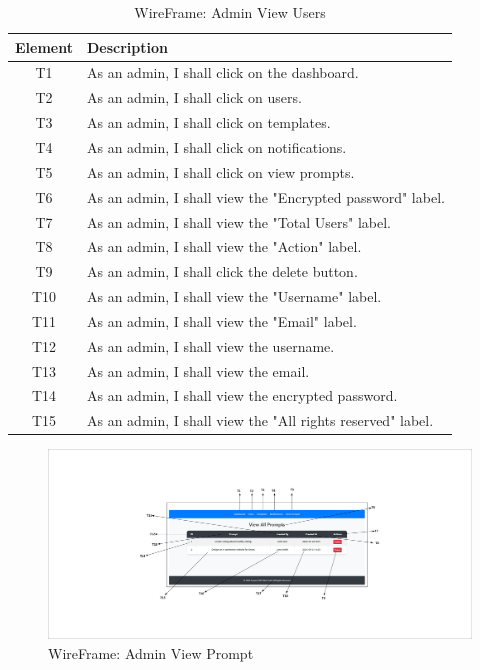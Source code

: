 \documentclass[12pt]{report}
\begin{document}
\begin{table}[h!]
    \centering
    \begin{tabular}{|c|p{10cm}|}
        \hline
        \textbf{Element} & \textbf{Description} \\
        \hline
        T1 & As an admin, I shall click on the dashboard. \\
        \hline
        T2 & As an admin, I shall click on users. \\
        \hline
        T3 & As an admin, I shall click on templates. \\
        \hline
        T4 & As an admin, I shall click on notifications. \\
        \hline
        T5 & As an admin, I shall click on view prompts. \\
        \hline
        T6 & As an admin, I shall view the "Encrypted password" label. \\
        \hline
        T7 & As an admin, I shall view the "Total Users" label. \\
        \hline
        T8 & As an admin, I shall view the "Action" label. \\
        \hline
        T9 & As an admin, I shall click the delete button. \\
        \hline
        T10 & As an admin, I shall view the "Username" label. \\
        \hline
        T11 & As an admin, I shall view the "Email" label. \\
        \hline
        T12 & As an admin, I shall view the username. \\
        \hline
        T13 & As an admin, I shall view the email. \\
        \hline
        T14 & As an admin, I shall view the encrypted password. \\
        \hline
        T15 & As an admin, I shall view the "All rights reserved" label. \\
        \hline
    \end{tabular}
    \caption{WireFrame: Admin View Users}
    \label{tab:admin_user_management_actions}
\end{table}
\begin{figure}[ht]
    \centering
    \includegraphics[width=1\textwidth, trim=10cm 5cm 10cm 5cm, clip]{Media/7.pdf} %
    \caption{WireFrame: Admin View Prompt}
    \label{fig:drawing1}
\end{figure}  
\end{document}
